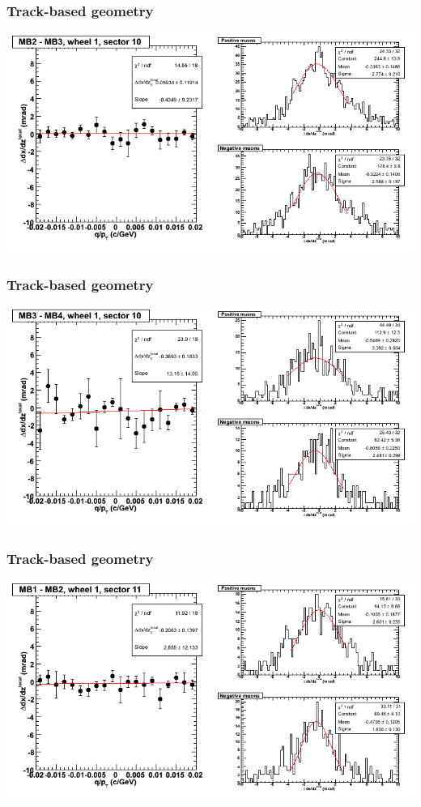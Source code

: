 \documentclass[compress]{beamer}
\begin{document}
\begin{frame}
\frametitle{Track-based geometry}
\includegraphics[width=\linewidth]{NOV4_segdiffs/dt13_slope_D_10_23.png}
\end{frame}

\begin{frame}
\frametitle{Track-based geometry}
\includegraphics[width=\linewidth]{NOV4_segdiffs/dt13_slope_D_10_34.png}
\end{frame}

\begin{frame}
\frametitle{Track-based geometry}
\includegraphics[width=\linewidth]{NOV4_segdiffs/dt13_slope_D_11_12.png}
\end{frame}
\end{document}
